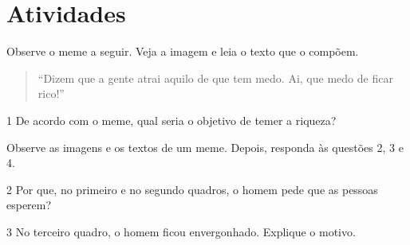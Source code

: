 \section{Atividades}

Observe o meme a seguir. Veja a imagem e leia o texto que o compõem.


\begin{quote}
``Dizem que a gente atrai aquilo de que tem medo. Ai, que medo de ficar rico!''
\end{quote}

\num{1} De acordo com o meme, qual seria o objetivo de temer a riqueza?



Observe as imagens e os textos de um meme. Depois, responda às questões 2, 3 e 4.




\num{2} Por que, no primeiro e no segundo quadros, o homem pede que as pessoas esperem?


\num{3} No terceiro quadro, o homem ficou envergonhado. Explique o motivo.


